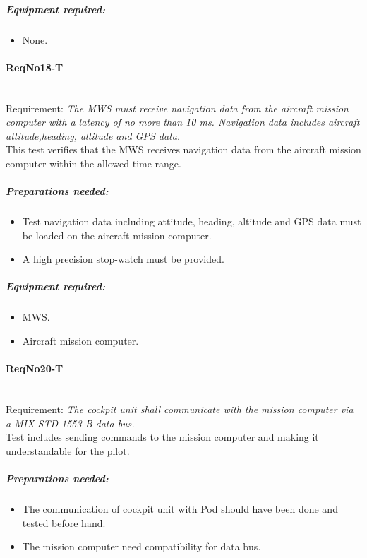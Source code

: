 	\subparagraph{Equipment required:}
	\begin{itemize}
	\item None.
	\end{itemize}

\paragraph{ReqNo18-T}\mbox{}\\ %
Requirement: \textit{The MWS must receive navigation data from the aircraft mission computer with a latency of no more than
10 ms. Navigation data includes aircraft attitude,heading, altitude and GPS data.}\\

This test verifies that the MWS receives navigation data from the aircraft mission computer within the allowed time range.

	\subparagraph{Preparations needed:}
	\begin{itemize}
	\item Test navigation data including attitude, heading, altitude and GPS data must be loaded on the aircraft mission computer.
	\item A high precision stop-watch must be provided.
	\end{itemize}
		
	\subparagraph{Equipment required:}
	\begin{itemize}
	\item MWS.
	\item Aircraft mission computer.
	\end{itemize}

\paragraph{ReqNo20-T}\mbox{}\\ %
Requirement: \textit{The cockpit unit shall communicate with the mission computer via a MIX-STD-1553-B data bus.}\\
Test includes sending commands to the mission computer and making it understandable for the pilot.
	\subparagraph{Preparations needed:}
	\begin{itemize}
	\item The communication of cockpit unit with Pod should have been done and tested before hand.
	\item The mission computer need compatibility for data bus.
	\end{itemize}

